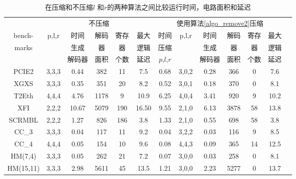 \begin{table}[t]%
\caption{在压缩和不压缩$l$ 和$r$的两种算法之间比较运行时间，电路面积和延迟}
\label{tab:compare_min}
\begin{tabular}{|c|c|c|c|c|c|c|c|c|c|c|c|c|}
\hline
            & \multicolumn{5}{|c|}{不压缩} &  \multicolumn{6}{|c|}{使用算法\ref{algo_remove2}压缩} \\\cline{2-12}
bench-      & p,l,r& 时间       & 解码    & 寄存& 最大                                      &时间        & p,l,r& 时间       &解码     & 寄存&最大\\
marks       &      & 生成       & 器      & 器  &  逻辑                                     &压缩        &      & 生成       & 器      & 器  &逻辑            \\
            &      & 解码器     &  面积   & 个数&延迟                                       &$p$,$l$,$r$ &      & 解码器     &  面积   & 个数& 延迟\\\hline\hline
PCIE2       & 3,3,3& 0.44       &  382    & 11  & 7.5                                       &0.68        & 3,0,2& 0.28       &  366    & 0   & 7.6             \\\hline
XGXS        & 3,3,3& 0.35       &  351    &20   &8.2                                        &0.52        & 3,0,1& 0.18       &  370    & 0   & 8.1             \\\hline
T2Eth       & 4,4,4& 4.76       &  1178   & 9   & 10.9                                      &6.25        & 4,0,4& 3.41       &  920    & 9   & 10.2            \\\hline
XFI         & 2,2,2& 10.67      & 5079    &190  & 16.50                                     &9.55        & 2,1,0& 6.13       &  3878   & 58  & 13.8            \\\hline
SCRMBL      & 2,2,2& 1.27       & 826     &186  &  3.8                                      &1.33        & 2,1,0& 0.55       &  698    & 58  & 3.8             \\\hline
CC\_3       & 3,3,3& 0.04       &  117    & 11  & 9.2                                       &0.04        & 3,2,2& 0.03       &  116    & 9   & 8.5             \\\hline
CC\_4       & 4,4,4& 0.05       & 154     & 10  & 9.6                                       &0.08        & 4,4,3& 0.09       &  365    & 14  & 12.5            \\\hline
HM(7,4)     & 3,3,3& 0.05       & 262     & 21  & 7.2                                       &0.07        & 3,0,0& 0.03       &  258    & 0   & 8.1             \\\hline
HM(15,11)   & 3,3,3& 2.98       & 5611    & 45  & 13.5                                      &1.21        & 3,0,0& 2.23       &  5277   & 0   & 13.7            \\\hline
\end{tabular}
\end{table}%

